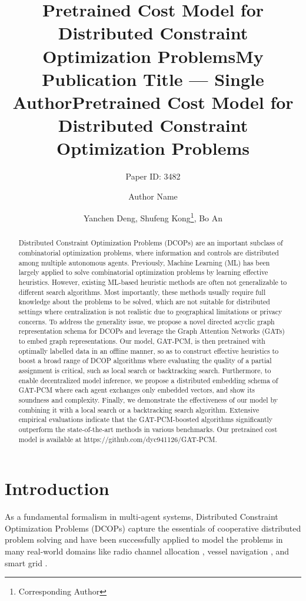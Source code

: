 \documentclass[letterpaper]{article} %
\title{Pretrained Cost Model for Distributed Constraint Optimization Problems}
\author{
    Paper ID: 3482
}
\title{My Publication Title --- Single Author}
\author {
    Author Name
}
\title{Pretrained Cost Model for Distributed Constraint Optimization Problems}
\author {
    Yanchen Deng,
    Shufeng Kong\footnote{Corresponding Author},
    Bo An
}
\begin{document}
\maketitle

\begin{abstract}
Distributed Constraint Optimization Problems (DCOPs) are an important subclass of combinatorial optimization problems, where information and controls are distributed among multiple autonomous agents.
Previously, Machine Learning (ML) has been largely applied to solve combinatorial optimization problems by learning effective heuristics. However, existing ML-based heuristic methods are often not generalizable to different search algorithms.
Most importantly, these methods usually require full knowledge about the problems to be solved, which are not suitable for distributed settings where centralization is not realistic due to geographical limitations or privacy concerns. To address the generality issue, we propose a novel directed acyclic graph representation schema for DCOPs and leverage the Graph Attention Networks (GATs) to embed graph representations. Our model, GAT-PCM, is then pretrained with optimally labelled data in an offline manner, so as to construct effective heuristics to boost a broad range of DCOP algorithms where evaluating the quality of a partial assignment is critical, such as local search or backtracking search. Furthermore, to enable decentralized model inference, we propose a distributed embedding schema of GAT-PCM where each agent exchanges only embedded vectors, and show its soundness and complexity.
Finally, we demonstrate the effectiveness of our model by combining it with a local search or a backtracking search algorithm. Extensive empirical evaluations indicate that the GAT-PCM-boosted algorithms significantly outperform the state-of-the-art methods in various benchmarks. Our pretrained cost model is available at https://github.com/dyc941126/GAT-PCM.

\end{abstract}

\section{Introduction}
As a fundamental formalism in multi-agent systems, Distributed Constraint Optimization Problems (DCOPs) \cite{modi2005adopt} capture the essentials of cooperative distributed problem solving and have been successfully applied to model the problems in many real-world domains like radio channel allocation \cite{monteiro2012multi}, vessel navigation \cite{hirayama2019dssa+}, and smart grid \cite{fioretto2017distributed}.
\end{document}
